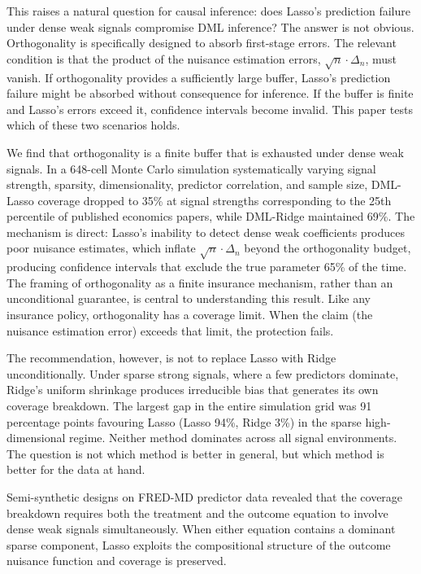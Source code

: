 \documentclass[a4paper,10.5pt]{article}
\begin{document}
This raises a natural question for causal inference: does Lasso's prediction failure under dense weak signals compromise DML inference? The answer is not obvious. Orthogonality is specifically designed to absorb first-stage errors. The relevant condition is that the product of the nuisance estimation errors, $\sqrt{n}\cdot\Delta_n$, must vanish. If orthogonality provides a sufficiently large buffer, Lasso's prediction failure might be absorbed without consequence for inference. If the buffer is finite and Lasso's errors exceed it, confidence intervals become invalid. This paper tests which of these two scenarios holds.

We find that orthogonality is a finite buffer that is exhausted under dense weak signals. In a 648-cell Monte Carlo simulation systematically varying signal strength, sparsity, dimensionality, predictor correlation, and sample size, DML-Lasso coverage dropped to 35\% at signal strengths corresponding to the 25th percentile of published economics papers, while DML-Ridge maintained 69\%. The mechanism is direct: Lasso's inability to detect dense weak coefficients produces poor nuisance estimates, which inflate $\sqrt{n}\cdot\Delta_n$ beyond the orthogonality budget, producing confidence intervals that exclude the true parameter 65\% of the time. The framing of orthogonality as a finite insurance mechanism, rather than an unconditional guarantee, is central to understanding this result. Like any insurance policy, orthogonality has a coverage limit. When the claim (the nuisance estimation error) exceeds that limit, the protection fails.

The recommendation, however, is not to replace Lasso with Ridge unconditionally. Under sparse strong signals, where a few predictors dominate, Ridge's uniform shrinkage produces irreducible bias that generates its own coverage breakdown. The largest gap in the entire simulation grid was 91 percentage points favouring Lasso (Lasso 94\%, Ridge 3\%) in the sparse high-dimensional regime. Neither method dominates across all signal environments. The question is not which method is better in general, but which method is better for the data at hand.

Semi-synthetic designs on FRED-MD predictor data revealed that the coverage breakdown requires both the treatment and the outcome equation to involve dense weak signals simultaneously. When either equation contains a dominant sparse component, Lasso exploits the compositional structure of the outcome nuisance function and coverage is preserved.
\end{document}

